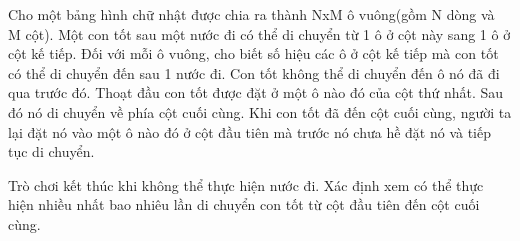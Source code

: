 Cho một bảng hình chữ nhật được chia ra thành NxM ô vuông(gồm N dòng và M cột). Một con tốt sau một nước đi có thể di chuyển từ 1 ô ở cột này sang 1 ô ở cột kế tiếp. Đối với mỗi ô vuông, cho biết số hiệu các ô ở cột kế tiếp mà con tốt có thể di chuyển đến sau 1 nước đi. Con tốt không thể di chuyển đến ô nó đã đi qua trước đó. Thoạt đầu con tốt được đặt ở một ô nào đó của cột thứ nhất. Sau đó nó di chuyển về phía cột cuối cùng. Khi con tốt đã đến cột cuối cùng, người ta lại đặt nó vào một ô nào đó ở cột đầu tiên mà trước nó chưa hề đặt nó và tiếp tục di chuyển.  

   Trò chơi kết thúc khi không thể thực hiện nước đi.
Xác định xem có thể thực hiện nhiều nhất bao nhiêu lần di chuyển con tốt từ cột đầu tiên đến cột cuối cùng.